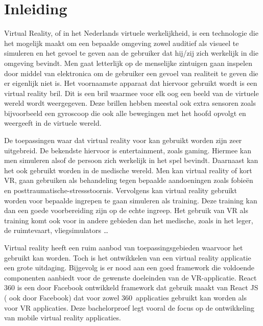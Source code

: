 
\chapter{Inleiding}
\label{ch:inleiding}
Virtual Reality, of in het Nederlands virtuele werkelijkheid, is een technologie die het mogelijk maakt om een bepaalde omgeving zowel auditief als visueel te simuleren en het gevoel te geven aan de gebruiker dat hij/zij zich werkelijk in die omgeving bevindt. Men gaat letterlijk op de menselijke zintuigen gaan inspelen door middel van elektronica om de gebruiker een gevoel van realiteit te geven die er eigenlijk niet is. Het voornaamste apparaat dat hiervoor gebruikt wordt is een virtual reality bril. Dit is een bril waarmee voor elk oog een beeld van de virtuele wereld wordt weergegeven. Deze brillen hebben meestal ook extra sensoren zoals bijvoorbeeld een gyroscoop die ook alle bewegingen met het hoofd opvolgt en weergeeft in de virtuele wereld.

De toepassingen waar dat virtual reality voor kan gebruikt worden zijn zeer uitgebreid. De bekendste hiervoor is entertainment, zoals gaming. Hiermee kan men simuleren alsof de persoon zich werkelijk in het spel bevindt. Daarnaast kan het ook gebruikt worden in de medische wereld. Men kan virtual reality of kort VR, gaan gebruiken als behandeling tegen bepaalde aandoeningen zoals fobieën en posttraumatische-stressstoornis. Vervolgens kan virtual reality gebruikt worden voor bepaalde ingrepen te gaan simuleren als training. Deze training kan dan een goede voorbereiding zijn op de echte ingreep. Het gebruik van VR als training komt ook voor in andere gebieden dan het medische, zoals in het leger, de ruimtevaart, vliegsimulators …

Virtual reality heeft een ruim aanbod van toepassingsgebieden waarvoor het gebruikt kan worden. Toch is het ontwikkelen van een virtual reality applicatie een grote uitdaging. Bijgevolg is er nood aan een goed framework die voldoende componenten aanbiedt voor de gewenste doeleinden van de VR-applicatie. React 360 is een door Facebook ontwikkeld framework dat gebruik maakt van React JS ( ook door Facebook) dat voor zowel 360\textdegree\ applicaties gebruikt kan worden als voor VR applicaties. Deze bachelorproef legt vooral de focus op de ontwikkeling van mobile virtual reality applicaties.


